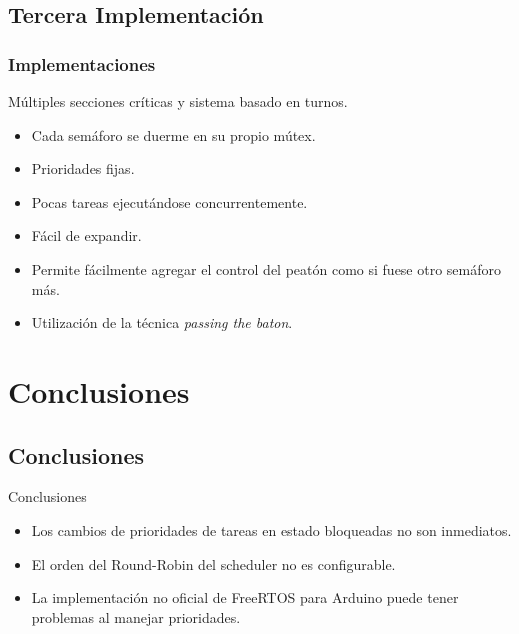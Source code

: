 \subsection{Tercera Implementación}
\begin{frame}
\frametitle{Implementaciones}
\begin{block}{Múltiples secciones críticas y sistema basado en turnos.}
	\begin{itemize}
		\item Cada semáforo se duerme en su propio mútex.
		\item Prioridades fijas.
		\item Pocas tareas ejecutándose concurrentemente.
		\item Fácil de expandir.
		\item Permite fácilmente agregar el control del peatón como si fuese otro semáforo más.
		\item Utilización de la técnica \emph{passing the baton}.
	\end{itemize}
\end{block}
\end{frame}

\section{Conclusiones}

\subsection{Conclusiones}
\begin{frame}
	\begin{block}{Conclusiones}
		\begin{itemize}
			\item Los cambios de prioridades de tareas en estado bloqueadas no son inmediatos.
			\item El orden del Round-Robin del scheduler no es configurable.
			\item La implementación no oficial de FreeRTOS para Arduino puede tener problemas al manejar prioridades.
		\end{itemize}
	\end{block}
\end{frame}